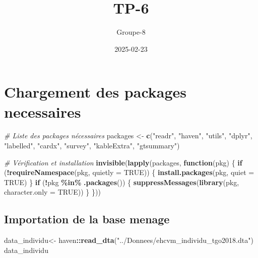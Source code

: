 \documentclass[
]{article}
\title{TP-6}
\author{Groupe-8}
\date{2025-02-23}
\newenvironment{Shaded}{\begin{snugshade}}{\end{snugshade}}
\newcommand{\AttributeTok}[1]{\textcolor[rgb]{0.13,0.29,0.53}{#1}}
\newcommand{\CommentTok}[1]{\textcolor[rgb]{0.56,0.35,0.01}{\textit{#1}}}
\newcommand{\ConstantTok}[1]{\textcolor[rgb]{0.56,0.35,0.01}{#1}}
\newcommand{\ControlFlowTok}[1]{\textcolor[rgb]{0.13,0.29,0.53}{\textbf{#1}}}
\newcommand{\FunctionTok}[1]{\textcolor[rgb]{0.13,0.29,0.53}{\textbf{#1}}}
\newcommand{\NormalTok}[1]{#1}
\newcommand{\OtherTok}[1]{\textcolor[rgb]{0.56,0.35,0.01}{#1}}
\newcommand{\SpecialCharTok}[1]{\textcolor[rgb]{0.81,0.36,0.00}{\textbf{#1}}}
\newcommand{\StringTok}[1]{\textcolor[rgb]{0.31,0.60,0.02}{#1}}
\begin{document}
\maketitle

{
\setcounter{tocdepth}{2}
\tableofcontents
}
\section{Chargement des packages
necessaires}\label{chargement-des-packages-necessaires}

\begin{Shaded}
\begin{Highlighting}[]
\CommentTok{\# Liste des packages nécessaires}
\NormalTok{packages }\OtherTok{\textless{}{-}} \FunctionTok{c}\NormalTok{(}\StringTok{"readr"}\NormalTok{, }\StringTok{"haven"}\NormalTok{, }\StringTok{"utils"}\NormalTok{, }\StringTok{"dplyr"}\NormalTok{, }\StringTok{"labelled"}\NormalTok{, }\StringTok{"cardx"}\NormalTok{, }\StringTok{"survey"}\NormalTok{, }\StringTok{"kableExtra"}\NormalTok{,  }\StringTok{"gtsummary"}\NormalTok{)}

\CommentTok{\# Vérification et installation}
\FunctionTok{invisible}\NormalTok{(}\FunctionTok{lapply}\NormalTok{(packages, }\ControlFlowTok{function}\NormalTok{(pkg) \{}
  \ControlFlowTok{if}\NormalTok{ (}\SpecialCharTok{!}\FunctionTok{requireNamespace}\NormalTok{(pkg, }\AttributeTok{quietly =} \ConstantTok{TRUE}\NormalTok{)) \{}
    \FunctionTok{install.packages}\NormalTok{(pkg, }\AttributeTok{quiet =} \ConstantTok{TRUE}\NormalTok{)  }
\NormalTok{  \}}
  \ControlFlowTok{if}\NormalTok{ (}\SpecialCharTok{!}\NormalTok{pkg }\SpecialCharTok{\%in\%} \FunctionTok{.packages}\NormalTok{()) \{  }
    \FunctionTok{suppressMessages}\NormalTok{(}\FunctionTok{library}\NormalTok{(pkg, }\AttributeTok{character.only =} \ConstantTok{TRUE}\NormalTok{))}
\NormalTok{  \}}
\NormalTok{\}))}
\end{Highlighting}
\end{Shaded}

\subsection{Importation de la base
menage}\label{importation-de-la-base-menage}

\begin{Shaded}
\begin{Highlighting}[]
\NormalTok{data\_individu}\OtherTok{\textless{}{-}}\NormalTok{ haven}\SpecialCharTok{::}\FunctionTok{read\_dta}\NormalTok{(}\StringTok{"../Donnees/ehcvm\_individu\_tgo2018.dta"}\NormalTok{)}
\NormalTok{data\_individu}
\end{Highlighting}
\end{Shaded}
\end{document}
